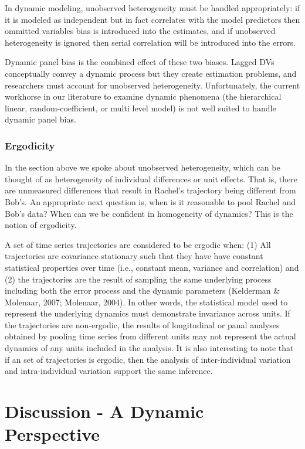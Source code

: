 \documentclass[english,,man]{apa6}
\begin{document}
In dynamic modeling, unobserved heterogeneity must be handled appropriately: if it is modeled as independent but in fact correlates with the model predictors then ommitted variables bias is introduced into the estimates, and if unobserved heterogeneity is ignored then serial correlation will be introduced into the errors.

Dynamic panel bias is the combined effect of these two biases. Lagged DVs conceptually convey a dynamic process but they create estimation problems, and researchers must account for unobserved heterogeneity. Unfortunately, the current workhorse in our literature to examine dynamic phenomena (the hierarchical linear, random-coefficient, or multi level model) is not well suited to handle dynamic panel bias.

\hypertarget{ergodicity}{%
\subsubsection{Ergodicity}\label{ergodicity}}

In the section above we spoke about unobserved heterogeneity, which can be thought of as heterogeneity of individual differences or unit effects. That is, there are unmeasured differences that result in Rachel's trajectory being different from Bob's. An appropriate next question is, when is it reasonable to pool Rachel and Bob's data? When can we be confident in homogeneity of dynamics? This is the notion of ergodicity.

A set of time series trajectories are considered to be ergodic when: (1) All trajectories are covariance stationary such that they have have constant statistical properties over time (i.e., constant mean, variance and correlation) and (2) the trajectories are the result of sampling the same underlying process including both the error process and the dynamic parameters (Kelderman \& Molenaar, 2007; Molenaar, 2004). In other words, the statistical model used to represent the underlying dynamics must demonstrate invariance across units. If the trajectories are non-ergodic, the results of longitudinal or panal analyses obtained by pooling time series from different units may not represent the actual dynamics of any units included in the analysis. It is also interesting to note that if an set of trajectories is ergodic, then the analysis of inter-individual variation and intra-individual variation support the same inference.

\hypertarget{discussion---a-dynamic-perspective}{%
\section{Discussion - A Dynamic Perspective}\label{discussion---a-dynamic-perspective}}
\end{document}
